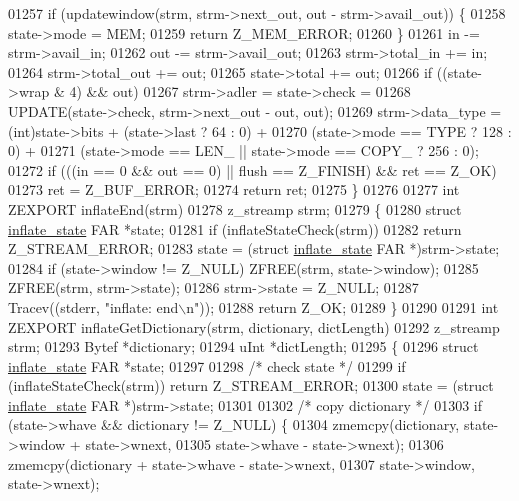 \begin{DoxyCode}
{{{{{{{{{{{{01257         \textcolor{keywordflow}{if} (updatewindow(strm, strm->next\_out, out - strm->avail\_out)) \{
01258             state->mode = MEM;
01259             \textcolor{keywordflow}{return} Z\_MEM\_ERROR;
01260         \}
01261     in -= strm->avail\_in;
01262     out -= strm->avail\_out;
01263     strm->total\_in += in;
01264     strm->total\_out += out;
01265     state->total += out;
01266     \textcolor{keywordflow}{if} ((state->wrap & 4) && out)
01267         strm->adler = state->check =
01268             UPDATE(state->check, strm->next\_out - out, out);
01269     strm->data\_type = (int)state->bits + (state->last ? 64 : 0) +
01270                       (state->mode == TYPE ? 128 : 0) +
01271                       (state->mode == LEN\_ || state->mode == COPY\_ ? 256 : 0);
01272     \textcolor{keywordflow}{if} (((in == 0 && out == 0) || flush == Z\_FINISH) && ret == Z\_OK)
01273         ret = Z\_BUF\_ERROR;
01274     \textcolor{keywordflow}{return} ret;
01275 \}
01276 
01277 \textcolor{keywordtype}{int} ZEXPORT inflateEnd(strm)
01278 z\_streamp strm;
01279 \{
01280     \textcolor{keyword}{struct }\hyperlink{structinflate__state}{inflate\_state} FAR *state;
01281     \textcolor{keywordflow}{if} (inflateStateCheck(strm))
01282         \textcolor{keywordflow}{return} Z\_STREAM\_ERROR;
01283     state = (\textcolor{keyword}{struct }\hyperlink{structinflate__state}{inflate\_state} FAR *)strm->state;
01284     if (state->window != Z\_NULL) ZFREE(strm, state->window);
01285     ZFREE(strm, strm->state);
01286     strm->state = Z\_NULL;
01287     Tracev((stderr, \textcolor{stringliteral}{"inflate: end\(\backslash\)n"}));
01288     \textcolor{keywordflow}{return} Z\_OK;
01289 \}
01290 
01291 \textcolor{keywordtype}{int} ZEXPORT inflateGetDictionary(strm, dictionary, dictLength)
01292 z\_streamp strm;
01293 Bytef *dictionary;
01294 uInt *dictLength;
01295 \{
01296     \textcolor{keyword}{struct }\hyperlink{structinflate__state}{inflate\_state} FAR *state;
01297 
01298     \textcolor{comment}{/* check state */}
01299     \textcolor{keywordflow}{if} (inflateStateCheck(strm)) \textcolor{keywordflow}{return} Z\_STREAM\_ERROR;
01300     state = (\textcolor{keyword}{struct }\hyperlink{structinflate__state}{inflate\_state} FAR *)strm->state;
01301 
01302     \textcolor{comment}{/* copy dictionary */}
01303     if (state->whave && dictionary != Z\_NULL) \{
01304         zmemcpy(dictionary, state->window + state->wnext,
01305                 state->whave - state->wnext);
01306         zmemcpy(dictionary + state->whave - state->wnext,
01307                 state->window, state->wnext);
}}}}}}}}}}}}
\end{DoxyCode}
